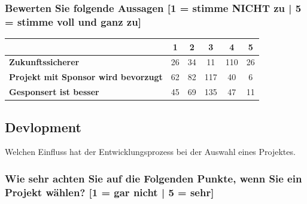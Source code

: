 \subsubsection*{Bewerten Sie folgende Aussagen [1 = stimme NICHT zu | 5 = stimme voll und ganz zu]}

\begin{table}[h]
    \begin{tabular}{l|c|c|c|c|c|}
        \textbf{}                                   & \textbf{1} & \textbf{2} & \textbf{3} & \textbf{4} & \textbf{5} \\ \hline
        \textbf{Zukunftssicherer}                   & 26         & 34         & 11         & 110        & 26         \\ \hline
        \textbf{Projekt mit Sponsor wird bevorzugt} & 62         & 82         & 117        & 40         & 6          \\ \hline
        \textbf{Gesponsert ist besser}              & 45         & 69         & 135        & 47         & 11         \\ \hline
    \end{tabular}%
\end{table}

\newpage
\subsection{Devlopment}

Welchen Einfluss hat der Entwicklungsprozess bei der Auswahl eines Projektes.

\subsubsection*{Wie sehr achten Sie auf die Folgenden Punkte, wenn Sie ein Projekt wählen? [1 = gar nicht | 5 = sehr]}



